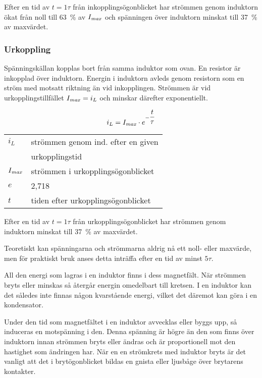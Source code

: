 Efter en tid av \(t = 1\tau\) från inkopplingsögonblicket har strömmen genom
induktorn ökat från noll till 63~\% av \(I_{\it max}\) och spänningen över induktorn
minskat till 37~\% av maxvärdet.

\subsubsection{Urkoppling}
\label{induktor_urkoppling}

Spänningskällan kopplas bort från samma induktor som ovan.
En resistor är inkopplad över induktorn.
Energin i induktorn avleds genom resistorn som en ström med motsatt riktning än vid inkopplingen.
Strömmen är vid urkopplingstillfället \(I_{\it max} = i_L\) och minskar därefter exponentiellt.

\[i_L = I_{\it max} \cdot e^{-\dfrac{t}{\tau}}\]

\begin{tabular}{lp{}}
  \(i_L\) & strömmen genom ind. efter en given \\
          &ur\-kop\-p\-li\-ngs\-tid \\
  \(I_{\it max}\) & strömmen i urkopplingsögonblicket \\
  \(e\) & 2,718 \\
  \(t\) & tiden efter urkopplingsögonblicket \\
\end{tabular}

\vspace*{1ex}

\noindent
Efter en tid av \(t = 1\tau\) från urkopplingsögonblicket har strömmen genom
induktorn minskat till 37~\% av maxvärdet.

Teoretiskt kan spänningarna och strömmarna aldrig nå ett noll- eller maxvärde,
men för praktiskt bruk anses detta inträffa efter en tid av minst \(5\tau\).

All den energi som lagras i en induktor finns i dess magnetfält.
När strömmen bryts eller minskas så återgår energin omedelbart till kretsen.
I en induktor kan det således inte finnas någon kvarstående energi, vilket
det däremot kan göra i en kondensator.

Under den tid som magnetfältet i en induktor avvecklas eller byggs upp, så
induceras en motspänning i den.
Denna spänning är högre än den som finns över induktorn innan strömmen bryts
eller ändras och är proportionell mot den hastighet som ändringen har.
När en en strömkrets med induktor bryts är det vanligt att det i brytögonblicket
bildas en gnista eller ljusbåge över brytarens kontakter.

